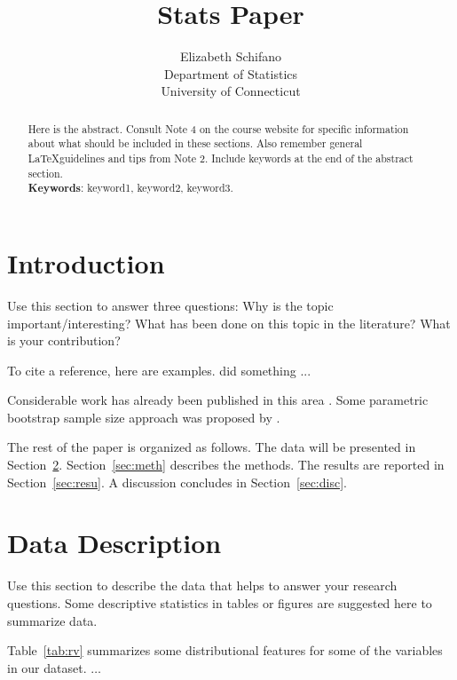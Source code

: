 \documentclass[12pt]{article}
\title{Stats Paper}
\author{Elizabeth Schifano\\
  Department of Statistics\\
  University of Connecticut
}
\begin{document}
\maketitle

\begin{abstract}
Here is the abstract.  Consult Note 4 on the course website for specific 
information about what should be included in these sections.  Also remember 
general \LaTeX guidelines and tips from Note 2. 
Include keywords at the end of the abstract section.\\

\noindent\textbf{Keywords}: keyword1, keyword2, keyword3.
\end{abstract}


\section{Introduction}
\label{sec:intro}

Use this section to answer three questions:
Why is the topic important/interesting?
What has been done on this topic in the literature?
What is your contribution?


To cite a reference, here are examples.
\citet{xie2015dynamic} did something ... 

Considerable work has already been published in this area 
\citep[e.g.,][]{xie2015dynamic}. Some parametric bootstrap sample size 
approach was proposed by \citet{dwivedi2017analysis}. 


The rest of the paper is organized as follows. The data will be presented in 
Section~\ref{sec:data}. Section~\ref{sec:meth} describes the methods. The 
results are reported in Section~\ref{sec:resu}. A discussion concludes in 
Section~\ref{sec:disc}.


\section{Data Description}
\label{sec:data}

Use this section to describe the data that helps to answer your research
questions. Some descriptive statistics in tables or figures are suggested 
here to summarize data.

Table~\ref{tab:rv} summarizes some distributional features for some of the 
variables in our dataset. $\ldots$
\end{document}
